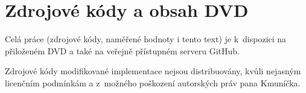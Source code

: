 \chapter{Zdrojové kódy a obsah DVD}
Celá práce (zdrojové kódy, naměřené hodnoty i tento text) je k~dispozici na přiloženém DVD a také na veřejně přístupném serveru GitHub\cite{rankgithubmindex}.

Zdrojové kódy modifikované implementace \CC{} nejsou distribuovány, kvůli nejasným licenčním podmínkám a z~možného poškození autorských práv pana Kmuníčka.